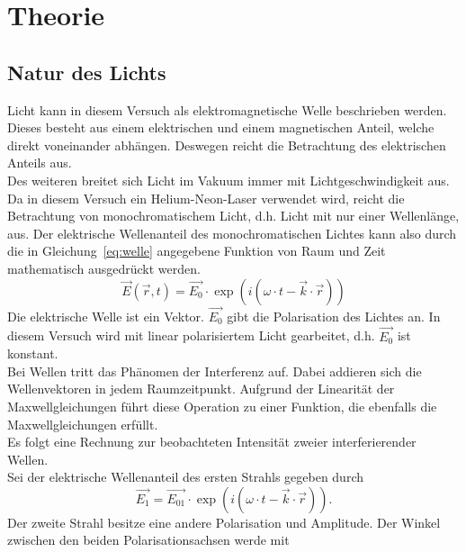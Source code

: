
\section{Theorie}
\subsection{Natur des Lichts}
%
Licht kann in diesem Versuch als elektromagnetische Welle 
beschrieben werden.\\
Dieses besteht aus einem elektrischen und einem magnetischen Anteil, 
welche direkt voneinander abhängen. Deswegen reicht die Betrachtung 
des elektrischen Anteils aus.\\
Des weiteren breitet sich Licht im Vakuum immer mit 
Lichtgeschwindigkeit aus.\\
Da in diesem Versuch ein Helium-Neon-Laser verwendet wird, 
reicht die Betrachtung von monochromatischem Licht, d.h. Licht 
mit nur einer Wellenlänge, aus. Der elektrische Wellenanteil des 
monochromatischen Lichtes kann also durch die in 
Gleichung~\eqref{eq:welle} angegebene Funktion von 
Raum und Zeit mathematisch ausgedrückt werden.
%
\begin{equation}
\vec{E}(\vec{r},t) = \vec{E_0}\cdot \exp{(i(\omega\cdot t - 
\vec{k}\cdot \vec{r}))}
\label{eq:welle}
\end{equation}
%
Die elektrische Welle ist ein Vektor.
$\vec{E_0}$ gibt die Polarisation des Lichtes an. In diesem Versuch 
wird mit linear polarisiertem Licht gearbeitet, d.h. $\vec{E_0}$ ist 
konstant.\\
Bei Wellen tritt das Phänomen der Interferenz auf. Dabei 
addieren sich die Wellenvektoren in jedem Raumzeitpunkt.
Aufgrund der Linearität der Maxwellgleichungen führt diese Operation 
zu einer Funktion, die ebenfalls die Maxwellgleichungen erfüllt.\\
Es folgt eine Rechnung zur beobachteten Intensität zweier 
interferierender Wellen.\\
Sei der elektrische Wellenanteil des ersten Strahls gegeben durch
\begin{equation}
\vec{E_1} = \vec{E_{01}}\cdot \exp{(i(\omega\cdot t - 
\vec{k}\cdot \vec{r}))}.
\end{equation}
Der zweite Strahl besitze eine andere Polarisation und Amplitude.
Der Winkel zwischen den beiden Polarisationsachsen werde mit 
